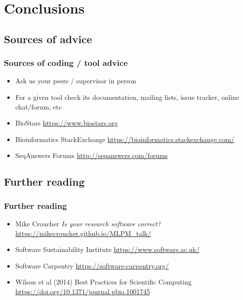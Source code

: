 \section{Conclusions}

\subsection{Sources of advice}

\begin{frame}
  \frametitle{Sources of coding / tool advice}
  \begin{itemize}
    \item Ask us your peers / supervisor in person
    \item For a given tool check its documentation, mailing lists, issue tracker, online chat/forum, etc
    \item BioStars \url{https://www.biostars.org}
    \item Bioinformatics StackExchange \url{https://bioinformatics.stackexchange.com/}
    \item SeqAnswers Forums \url{http://seqanswers.com/forums}
 \end{itemize}
\end{frame}

\subsection{Further reading}

\begin{frame}
  \frametitle{Further reading}
  \begin{itemize}

    \item Mike Croucher \emph{Is your research software correct?}
    \url{https://mikecroucher.github.io/MLPM_talk/}

    \item Software Sustainability Institute
    \url{https://www.software.ac.uk/}

    \item Software Carpentry
    \url{https://software-carpentry.org/}

    \item Wilson et al (2014) Best Practices for Scientific Computing
    \url{https://doi.org/10.1371/journal.pbio.1001745}

  \end{itemize}
\end{frame}


